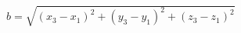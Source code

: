 \documentclass{standalone}
\begin{document}
    $b = \sqrt{ (x_3 - x_1)^2 + (y_3 - y_1)^2 + (z_3 - z_1)^2 }$
\end{document}
